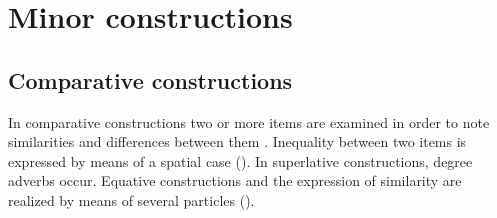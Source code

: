 \chapter{Minor constructions}
\label{cpt:Minor constructions}



\section{Comparative constructions}
\label{sec:Comparative constructions}

In comparative constructions two or more items are examined in order to note similarities and differences between them \citep[787]{Dixon2008}. Inequality between two items is expressed by means of a spatial case (). In superlative constructions, degree adverbs occur. Equative constructions and the expression of similarity are realized by means of several particles ().


